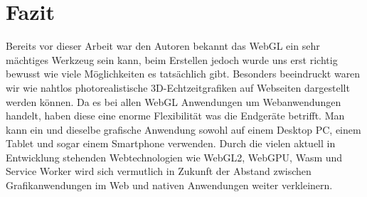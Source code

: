 \section{Fazit}
Bereits vor dieser Arbeit war den Autoren bekannt das WebGL ein sehr mächtiges Werkzeug sein kann, beim Erstellen jedoch wurde uns erst richtig bewusst wie viele Möglichkeiten es tatsächlich gibt. Besonders beeindruckt waren wir wie nahtlos photorealistische 3D-Echtzeitgrafiken auf Webseiten dargestellt werden können. Da es bei allen WebGL Anwendungen um Webanwendungen handelt, haben diese eine enorme Flexibilität was die Endgeräte betrifft. Man kann ein und dieselbe grafische Anwendung sowohl auf einem Desktop PC, einem Tablet und sogar einem Smartphone verwenden. Durch die vielen aktuell in Entwicklung stehenden Webtechnologien wie WebGL2, WebGPU, \ac{Wasm} und Service Worker wird sich vermutlich in Zukunft der Abstand zwischen Grafikanwendungen im Web und nativen Anwendungen weiter verkleinern. 